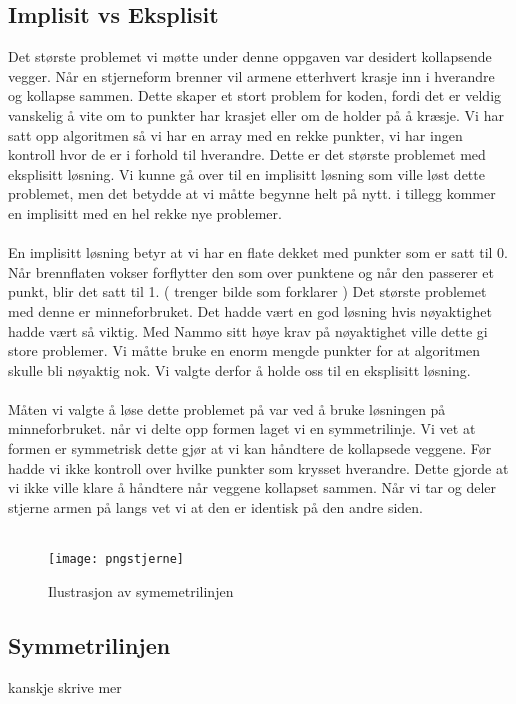 \subsection{Implisit vs Eksplisit}
Det største problemet vi møtte under denne oppgaven var desidert kollapsende vegger. Når en stjerneform brenner vil armene etterhvert krasje inn i hverandre og kollapse sammen. Dette skaper et stort problem for koden, fordi det er veldig vanskelig å vite om to punkter har krasjet eller om de holder på å kræsje. Vi har satt opp algoritmen så vi har en array med en rekke punkter, vi har ingen kontroll hvor de er i forhold til hverandre. Dette er det største problemet med eksplisitt løsning. Vi kunne gå over til en implisitt løsning som ville løst dette problemet, men det betydde at vi måtte begynne helt på nytt. i tillegg kommer en implisitt med en hel rekke nye problemer. \\ \\
En implisitt løsning betyr at vi har en flate dekket med punkter som er satt til 0. Når brennflaten vokser forflytter den som over punktene og når den passerer et punkt, blir det satt til 1. ( trenger bilde som forklarer ) Det største problemet med denne er minneforbruket. Det hadde vært en god løsning hvis nøyaktighet hadde vært så viktig. Med Nammo sitt høye krav på nøyaktighet ville dette gi store problemer. Vi måtte bruke en enorm mengde punkter for at algoritmen skulle bli nøyaktig nok. Vi valgte derfor å holde oss til en eksplisitt løsning.\\ \\
Måten vi valgte å løse dette problemet på var ved å bruke løsningen på minneforbruket. når vi delte opp formen laget vi en symmetrilinje. Vi vet at formen er symmetrisk dette gjør at vi kan håndtere de kollapsede veggene. Før hadde vi ikke kontroll over hvilke punkter som krysset hverandre. Dette gjorde at vi ikke ville klare å håndtere når veggene kollapset sammen. Når vi tar og deler stjerne armen på langs vet vi at den er identisk på den andre siden.\\ \\



\begin{figure}[h]
    \centering
    \texttt{[image: pngstjerne]}
    \caption{Ilustrasjon av symemetrilinjen}
    \label{fig:my_label}
\end{figure}



\subsection{Symmetrilinjen}
kanskje skrive mer \\ \\
\clearpage

